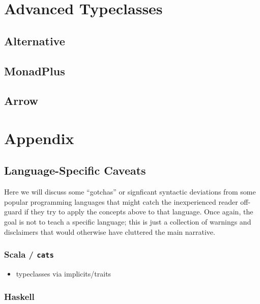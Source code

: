 \documentclass{book}
\begin{document}
\blindtext%

\chapter{Advanced Typeclasses}

\section{Alternative}

\blindtext%

\section{MonadPlus}

\blindtext%

\section{Arrow}

\blindtext%

\appendix
\chapter{Appendix}

\section{Language-Specific Caveats}\label{lang}

Here we will discuss some ``gotchas'' or signficant syntactic deviations from some popular programming languages that might catch the inexperienced reader off-guard if they try to apply the concepts above to that language. Once again, the goal is not to teach a specific language; this is just a collection of warnings and disclaimers that would otherwise have cluttered the main narrative.

\subsection{Scala / \texttt{cats}}\label{lang:scala}

\begin{itemize}
    \item typeclasses via implicits/traits
\end{itemize}

\subsection{Haskell}\label{lang:haskell}
\end{document}
